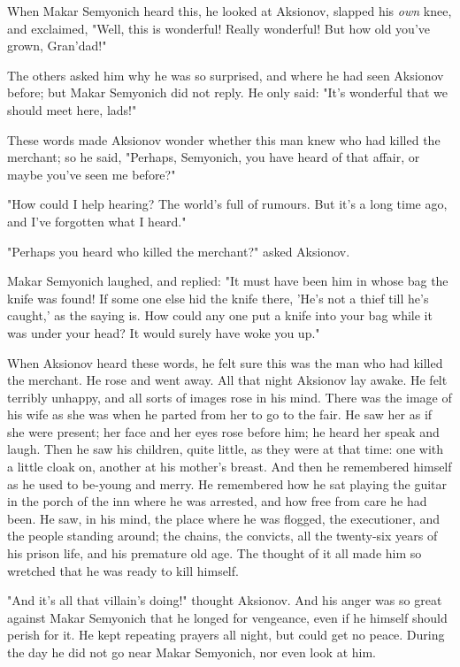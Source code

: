 When Makar Semyonich heard this, he looked at Aksionov, slapped his
\emph{own} knee, and exclaimed, "Well, this is wonderful! Really wonderful!
But how old you've grown, Gran'dad!"

The others asked him why he was so surprised, and where he had seen
Aksionov before; but Makar Semyonich did not reply. He only said:
"It's wonderful that we should meet here, lads!"

These words made Aksionov wonder whether this man knew who had killed
the merchant; so he said, "Perhaps, Semyonich, you have heard of that
affair, or maybe you've seen me before?"

"How could I help hearing? The world's full of rumours. But it's a
long time ago, and I've forgotten what I heard."

"Perhaps you heard who killed the merchant?" asked Aksionov.

Makar Semyonich laughed, and replied: "It must have been him in whose
bag the knife was found! If some one else hid the knife there, 'He's
not a thief till he's caught,' as the saying is. How could any one put
a knife into your bag while it was under your head? It would surely
have woke you up."

When Aksionov heard these words, he felt sure this was the man who had
killed the merchant. He rose and went away. All that night Aksionov
lay awake. He felt terribly unhappy, and all sorts of images rose in
his mind. There was the image of his wife as she was when he parted
from her to go to the fair. He saw her as if she were present; her
face and her eyes rose before him; he heard her speak and laugh. Then
he saw his children, quite little, as they were at that time: one
with a little cloak on, another at his mother's breast. And then he
remembered himself as he used to be-young and merry. He remembered how
he sat playing the guitar in the porch of the inn where he was
arrested, and how free from care he had been. He saw, in his mind, the
place where he was flogged, the executioner, and the people standing
around; the chains, the convicts, all the twenty-six years of his
prison life, and his premature old age. The thought of it all made him
so wretched that he was ready to kill himself.

"And it's all that villain's doing!" thought Aksionov. And his anger
was so great against Makar Semyonich that he longed for vengeance,
even if he himself should perish for it. He kept repeating prayers all
night, but could get no peace. During the day he did not go near Makar
Semyonich, nor even look at him.

